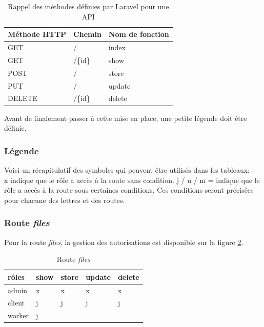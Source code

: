 \documentclass[
    iai, %
    il, %
]{heig-tb}
\begin{document}
\begin{table}[h]
    \begin{center}
        \caption{Rappel des méthodes définies par Laravel pour une API \label{rappel-methode-api}}
        \begin{tabularx}{1.0\textwidth} {X|X|X}
            Méthode HTTP & Chemin  & Nom de fonction \\ \hline
            GET          & /       & index           \\
            GET          & /\{id\} & show            \\
            POST         & /       & store           \\
            PUT          & /       & update          \\
            DELETE       & /\{id\} & delete          \\
        \end{tabularx}
    \end{center}
\end{table}

Avant de finalement passer à cette mise en place, une petite légende doit être définie.

\subsubsection{Légende}
Voici un récapitulatif des symboles qui peuvent être utilisés dans les tableaux: \\
x indique que le rôle a accès à la route sans condition.
j / u / m = indique que le rôle a accès à la route sous certaines conditions. Ces conditions seront précisées pour chacune des lettres et des routes.

\subsubsection{Route \emph{files}}
Pour la route \emph{files}, la gestion des autorisations est disponible sur la figure \ref{autorisations-route-files}.

\begin{table}[h]
    \begin{center}
        \caption{Route \emph{files} \label{autorisations-route-files}}
        \begin{tabularx}{1.0\textwidth} {X|X|X|X|X}
            rôles  & show & store & update & delete \\ \hline
            admin  & x    & x     & x      & x      \\
            client & j    & j     & j      & j      \\
            worker & j    &       &        &        \\
        \end{tabularx}
    \end{center}
\end{table}
\end{document}
